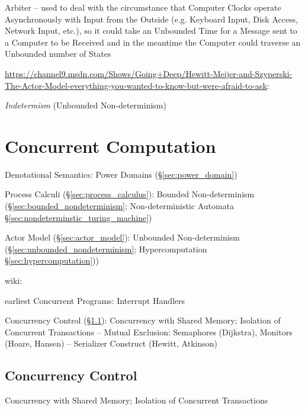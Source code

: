 Arbiter -- used to deal with the circumstance that Computer Clocks
operate Asynchronously with Input from the Outside (e.g. Keyboard
Input, Disk Access, Network Input, etc.), so it could take an
Unbounded Time for a Message sent to a Computer to be Received and in
the meantime the Computer could traverse an Unbounded number of States


\url{https://channel9.msdn.com/Shows/Going+Deep/Hewitt-Meijer-and-Szyperski-The-Actor-Model-everything-you-wanted-to-know-but-were-afraid-to-ask}:

\emph{Indetermism} (Unbounded Non-determinism)



\section{Concurrent Computation}\label{sec:concurrent_computation}

Denotational Semantics: Power Domains (\S\ref{sec:power_domain})

\fist Process Calculi (\S\ref{sec:process_calculus}): Bounded
Non-determinism (\S\ref{sec:bounded_nondeterminism}; \fist
Non-deterministic Automata \S\ref{sec:nondeterminstic_turing_machine})

\fist Actor Model (\S\ref{sec:actor_model}): Unbounded Non-determinism
(\S\ref{sec:unbounded_nondeterminism}; \fist Hypercomputation
\S\ref{sec:hypercomputation}))

wiki:

earliest Concurrent Programs: Interrupt Handlers %

Concurrency Control (\S\ref{sec:concurrency_control}): Concurrency
with Shared Memory; Isolation of Concurrent Transactions -- Mutual
Exclusion: Semaphores (Dijkstra), Monitors (Hoare, Hansen) --
Serializer Construct (Hewitt, Atkinson)



\subsection{Concurrency Control}\label{sec:concurrency_control}

Concurrency with Shared Memory; Isolation of Concurrent Transactions

